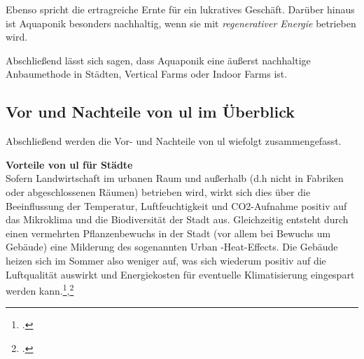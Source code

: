 \documentclass{scrartcl}
\begin{document}
Ebenso spricht die ertragreiche Ernte für ein lukratives Geschäft. Darüber hinaus ist Aquaponik besonders nachhaltig, wenn sie mit \textit{regenerativer Energie} betrieben wird. 

Abschließend lässt sich sagen, dass Aquaponik eine äußerst nachhaltige Anbaumethode in Städten, Vertical Farms oder Indoor Farms ist. 

\subsection{Vor und Nachteile von \acs{ul} im Überblick}

Abschließend werden die Vor- und Nachteile von \acs{ul} wiefolgt zusammengefasst.

\textbf{Vorteile von \acs{ul} für Städte} \\
Sofern Landwirtschaft im urbanen Raum und außerhalb (d.h nicht in Fabriken oder abgeschlossenen Räumen) betrieben wird, wirkt sich dies über die Beeinflussung der Temperatur, Luftfeuchtigkeit und CO2-Aufnahme positiv auf das Mikroklima und die Biodiversität der Stadt aus.
Gleichzeitig entsteht durch einen vermehrten Pflanzenbewuchs in der Stadt (vor allem bei Bewuchs um Gebäude) eine Milderung des sogenannten Urban -Heat-Effects. Die Gebäude heizen sich im Sommer also weniger auf, was sich wiederum positiv auf die Luftqualität auswirkt und Energiekosten für eventuelle Klimatisierung eingespart werden kann.\footcite{Schulz2013UrbaneLandmanagements},\footcite[Vgl.][S.16]{Spring2012DerBasel-Stadt}
\end{document}
